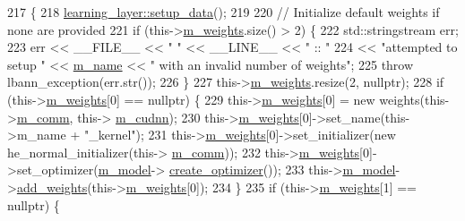 \begin{DoxyCode}
217                              \{
218     \hyperlink{classlbann_1_1Layer_a50a89f8a68762c677d48efe384676e81}{learning\_layer::setup\_data}();
219 
220     \textcolor{comment}{// Initialize default weights if none are provided}
221     \textcolor{keywordflow}{if} (this->\hyperlink{classlbann_1_1Layer_a7954e30fbf9100a6ba4b56d02767a469}{m\_weights}.size() > 2) \{
222       std::stringstream err;
223       err << \_\_FILE\_\_ << \textcolor{stringliteral}{" "} << \_\_LINE\_\_ << \textcolor{stringliteral}{" :: "}
224           << \textcolor{stringliteral}{"attempted to setup "} << \hyperlink{classlbann_1_1Layer_aa47109ad09b399142fa92f9d3702189f}{m\_name} << \textcolor{stringliteral}{" with an invalid number of weights"};
225       \textcolor{keywordflow}{throw} lbann\_exception(err.str());
226     \}
227     this->\hyperlink{classlbann_1_1Layer_a7954e30fbf9100a6ba4b56d02767a469}{m\_weights}.resize(2, \textcolor{keyword}{nullptr});
228     \textcolor{keywordflow}{if} (this->\hyperlink{classlbann_1_1Layer_a7954e30fbf9100a6ba4b56d02767a469}{m\_weights}[0] == \textcolor{keyword}{nullptr}) \{
229       this->\hyperlink{classlbann_1_1Layer_a7954e30fbf9100a6ba4b56d02767a469}{m\_weights}[0] = \textcolor{keyword}{new} weights(this->\hyperlink{classlbann_1_1Layer_a5de05c52f22e0bbd7c703bec3ad4dbf2}{m\_comm}, this->
      \hyperlink{classlbann_1_1Layer_a08dbb94239e3b8c96329786c57c72e21}{m\_cudnn});
230       this->\hyperlink{classlbann_1_1Layer_a7954e30fbf9100a6ba4b56d02767a469}{m\_weights}[0]->set\_name(this->m\_name + \textcolor{stringliteral}{"\_kernel"});
231       this->\hyperlink{classlbann_1_1Layer_a7954e30fbf9100a6ba4b56d02767a469}{m\_weights}[0]->set\_initializer(\textcolor{keyword}{new} he\_normal\_initializer(this->
      \hyperlink{classlbann_1_1Layer_a5de05c52f22e0bbd7c703bec3ad4dbf2}{m\_comm}));
232       this->\hyperlink{classlbann_1_1Layer_a7954e30fbf9100a6ba4b56d02767a469}{m\_weights}[0]->set\_optimizer(\hyperlink{classlbann_1_1Layer_a3d9315e99574166f2f33e37b572021d2}{m\_model}->
      \hyperlink{classlbann_1_1model_a0d2d5a1eac592e5721a81a9b9ea4b7f2}{create\_optimizer}());
233       this->\hyperlink{classlbann_1_1Layer_a3d9315e99574166f2f33e37b572021d2}{m\_model}->\hyperlink{classlbann_1_1model_af35fca77e75eb6dd570e4727aa3d5b6b}{add\_weights}(this->\hyperlink{classlbann_1_1Layer_a7954e30fbf9100a6ba4b56d02767a469}{m\_weights}[0]);
234     \}
235     \textcolor{keywordflow}{if} (this->\hyperlink{classlbann_1_1Layer_a7954e30fbf9100a6ba4b56d02767a469}{m\_weights}[1] == \textcolor{keyword}{nullptr}) \{

\end{DoxyCode}
